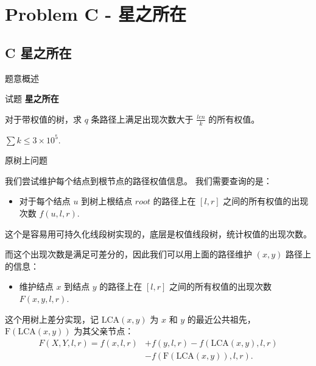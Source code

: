 \documentclass{beamer}
\newcommand{\TT}[1] {{\ttfamily #1}}
\newcommand{\BF}[1] {\textbf{#1}}
\begin{document}
{

\section[C]{Problem C - 星之所在}
\subsection{C 星之所在}

\begin{frame}{题意概述}

\begin{center}
试题 \myboxiii{      \BF{\TT{C}}} \BF{星之所在}
\end{center}

对于带权值的树，求 $q$ 条路径上满足出现次数大于 $\frac{len}{k}$ 的所有权值。

$\sum k \le 3 \times 10^5$.

\end{frame}

\begin{frame}{原树上问题}

我们尝试维护每个结点到根节点的路径权值信息。 我们需要查询的是：

\begin{itemize}
  \item 对于每个结点 $u$ 到树上根结点 $root$ 的路径上在 $[l, r]$ 之间的所有权值的出现次数 $f(u, l, r)$.
\end{itemize}


这个是容易用可持久化线段树实现的，底层是权值线段树，统计权值的出现次数。

而这个出现次数是满足可差分的，因此我们可以用上面的路径维护 $(x, y)$ 路径上的信息：

\begin{itemize}
  \item 维护结点 $x$ 到结点 $y$ 的路径上在 $[l, r]$ 之间的所有权值的出现次数 $F(x, y, l, r)$.
\end{itemize}

这个用树上差分实现，记 $\text{LCA}(x, y)$ 为 $x$ 和 $y$ 的最近公共祖先， $\text{F}(\text{LCA}(x, y))$ 为其父亲节点：
\begin{align*}
   F(X,Y, l, r) = f(x, l, r) &+ f(y, l, r) - f(\text{LCA}(x, y), l, r)\\
          &- f(\text{F}(\text{LCA}(x, y)), l, r).
\end{align*}


\end{frame}}
\end{document}
